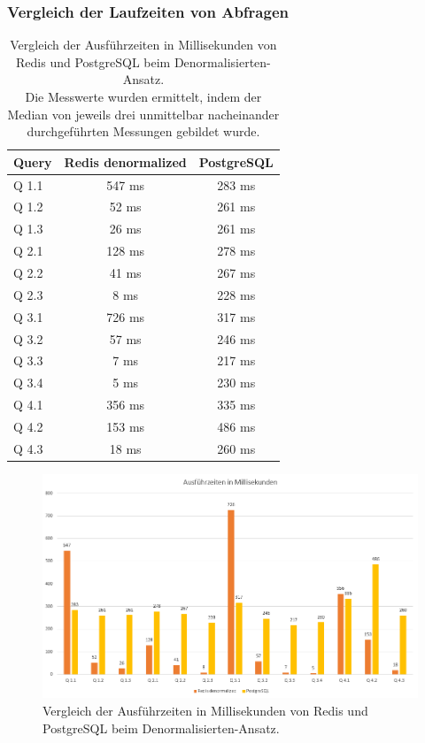 \subsubsection{Vergleich der Laufzeiten von Abfragen}
\begin{table}[h]
\centering
\begin{tabular}{lcc}
\hline
Query & Redis denormalized & PostgreSQL \\ \hline
Q 1.1 & 547 ms  & 283 ms       \\
Q 1.2 & 52 ms   & 261 ms       \\
Q 1.3 & 26 ms   & 261 ms       \\
Q 2.1 & 128 ms  & 278 ms       \\
Q 2.2 & 41 ms   & 267 ms       \\
Q 2.3 & 8 ms    & 228 ms       \\
Q 3.1 & 726 ms  & 317 ms       \\
Q 3.2 & 57 ms   & 246 ms       \\
Q 3.3 & 7 ms    & 217 ms       \\
Q 3.4 & 5 ms    & 230 ms       \\
Q 4.1 & 356 ms  & 335 ms       \\
Q 4.2 & 153 ms  & 486 ms       \\
Q 4.3 & 18 ms   & 260 ms       \\ \hline
\end{tabular}
\caption{Vergleich der Ausführzeiten in Millisekunden von Redis und PostgreSQL beim Denormalisierten-Ansatz.\\
Die Messwerte wurden ermittelt, indem der Median von jeweils drei unmittelbar nacheinander durchgeführten Messungen gebildet wurde.}
\label{tab:results-denormalized}
\end{table}


\begin{figure}[h]  %
    \centering      %
    \includegraphics[width=1\textwidth]{pictures/results/results-denormalized.png}
    \caption{Vergleich der Ausführzeiten in Millisekunden von Redis und Postgre\-SQL beim Denormalisierten-Ansatz.}      %
    \label{pic:results-denormalized}    %
\end{figure}

